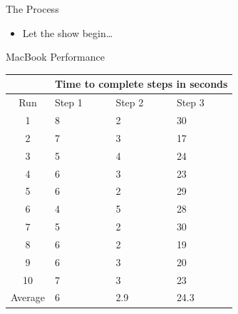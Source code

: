 \documentclass{beamer}
\begin{document}
\begin{frame}{The Process}
  \begin{itemize}
  \item Let the show begin\dots
  \end{itemize}
\end{frame}

\begin{frame}{MacBook Performance}
  \begin{tabularx}{275pt}{| c | X | X | X |}
    \hline
    & \multicolumn{3}{c|}{Time to complete steps in seconds} \\ \hline
    Run      & Step 1 & Step 2 & Step 3 \\ \hline
    1        & 8      & 2      & 30     \\ \hline
    2        & 7      & 3      & 17     \\ \hline
    3        & 5      & 4      & 24     \\ \hline
    4        & 6      & 3      & 23     \\ \hline
    5        & 6      & 2      & 29     \\ \hline
    6        & 4      & 5      & 28     \\ \hline
    7        & 5      & 2      & 30     \\ \hline
    8        & 6      & 2      & 19     \\ \hline
    9        & 6      & 3      & 20     \\ \hline
    10       & 7      & 3      & 23     \\ \hline
    Average  & 6      & 2.9    & 24.3   \\
    \hline
  \end{tabularx}
\end{frame}
\end{document}

